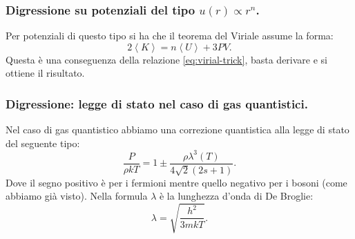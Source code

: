 \subsubsection{Digressione su potenziali del tipo $u(r) \propto r^n$.}
\label{subsubsec:Digressione su potenziali polinomiali.}
Per potenziali di questo tipo si ha che il teorema del Viriale assume la forma:
\[
	2\left<K \right> = n\left< U \right> + 3PV
.\] 
Questa è una conseguenza della relazione \ref{eq:virial-trick}, basta derivare e si ottiene il risultato.
\subsubsection{Digressione: legge di stato nel caso di gas quantistici.}
\label{subsubsec:Digressione: legge di stato nel caso di gas quantistici.}
Nel caso di gas quantistico abbiamo una correzione quantistica alla legge di stato del seguente tipo:
\[
	\frac{P}{\rho kT}
	=
	1 \pm \frac{\rho \lambda^3(T)}{4\sqrt{2} \left( 2s + 1 \right) }
.\] 
Dove il segno positivo è per i fermioni mentre quello negativo per i bosoni (come abbiamo già visto). Nella formula $\lambda$ è la lunghezza d'onda di De Broglie:
\[
	\lambda=\sqrt{\frac{h^2}{3mkT}} 
.\] 
